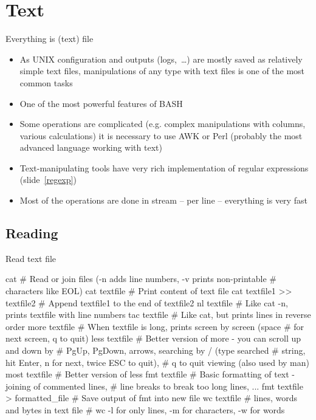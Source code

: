 \documentclass[compress, ucs, xelatex, 11pt, xcolor=svgnames,
  hyperref={
    bookmarks=true,
    unicode=true,
    colorlinks=true,
    pdftitle={Linux, command line and MetaCentrum},
    plainpages=false,
    pdfauthor={Vojtech Zeisek},
    pdfsubject={Course about use of Linux command line, writing shell scripts and using MetaCentrum of CESNET},
    pdfcreator={XeLaTeX},
    pdfkeywords={Linux, GNU, BASH, shell, command line, MetaCentrum},
    linkcolor=DarkRed,
    anchorcolor=DarkBlue,
    citecolor=Indigo,
    filecolor=NavyBlue,
    menucolor=DarkMagenta,
    urlcolor=DarkBlue,
    pdftex},
  url={hyphens, lowtilde} %
  ]{beamer}
\begin{document}
\section{Text}

\begin{frame}{Everything is (text) file}
  \begin{itemize}
    \item As UNIX configuration and outputs (logs,~\ldots) are mostly saved as relatively simple text files, manipulations of any type with text files is one of the most common tasks
    \item One of the most powerful features of BASH
    \item Some operations are complicated (e.g. complex manipulations with columns, various calculations) it is necessary to use AWK or Perl (probably the most advanced language working with text)
    \item Text-manipulating tools have very rich implementation of regular expressions (slide~\ref{regexp})
    \item Most of the operations are done in stream -- per line -- everything is very fast
  \end{itemize}
\end{frame}

\subsection{Reading}

\begin{frame}[fragile]{Read text file}
  \begin{bashcode}
    cat # Read or join files (-n adds line numbers, -v prints non-printable
        # characters like EOL)
    cat textfile # Print content of text file
    cat textfile1 >> textfile2 # Append textfile1 to the end of textfile2
    nl textfile # Like cat -n, prints textfile with line numbers
    tac textfile # Like cat, but prints lines in reverse order
    more textfile # When textfile is long, prints screen by screen (space
                  # for next screen, q to quit)
    less textfile # Better version of more - you can scroll up and down by
                  # PgUp, PgDown, arrows, searching by / (type searched
                  # string, hit Enter, n for next, twice ESC to quit),
                  # q to quit viewing (also used by man)
    most textfile # Better version of less
    fmt textfile # Basic formatting of text - joining of commented lines,
                 # line breaks to break too long lines, ...
    fmt textfile > formatted_file # Save output of fmt into new file
    wc textfile # lines, words and bytes in text file
                # wc -l for only lines, -m for characters, -w for words
  \end{bashcode}
\end{frame}
\end{document}
